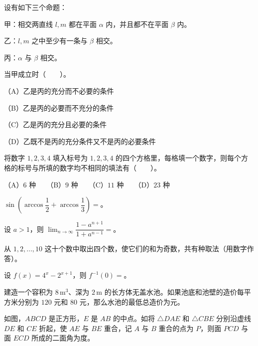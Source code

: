\begin{question}
设有如下三个命题：

甲：相交两直线 $l,m$ 都在平面 $\alpha$ 内，并且都不在平面 $\beta$ 内。

乙：$l,m$ 之中至少有一条与 $\beta$ 相交。

丙：$\alpha$ 与 $\beta$ 相交。

当甲成立时\mbox{（　　）}。

（A）乙是丙的充分而不必要的条件

（B）乙是丙的必要而不充分的条件

（C）乙是丙的充分且必要的条件

（D）乙既不是丙的充分条件又不是丙的必要条件

\end{question}
\begin{question}
将数字 $1,2,3,4$ 填入标号为 $1,2,3,4$ 的四个方格里，每格填一个数字，则每个方格的标号与所填的数字均不相同的填法有\mbox{（　　）}。

（A）$6$ 种　　（B）$9$ 种　　（C）$11$ 种　　（D）$23$ 种

\end{question}
\begin{question}
$\displaystyle\sin\left(\arccos\dfrac12+\arccos\dfrac13\right)=$\underline{\qquad\qquad}。

\end{question}
\begin{question}
设 $a>1$，则 $\displaystyle\lim_{n\to\infty}\dfrac{1-a^{n+1}}{1+a^{n-1}}=$\underline{\qquad\qquad}。

\end{question}
\begin{question}
从 $1,2,\ldots,10$ 这十个数中取出四个数，使它们的和为奇数，共有\underline{\qquad\qquad}种取法（用数字作答）。

\end{question}
\begin{question}
设 $f(x)=4^x-2^{x+1}$，则 $f^{-1}(0)=$\underline{\qquad\qquad}。

\end{question}
\begin{question}
建造一个容积为 $8\,\mathrm{m}^3$、深为 $2\,\mathrm m$ 的长方体无盖水池。如果池底和池壁的造价每平方米分别为 $120$ 元和 $80$ 元，那么水池的最低总造价为\underline{\qquad\qquad}元。

\Needspace{0.4\textheight}
\end{question}
\begin{question}
如图，$ABCD$ 是正方形，$E$ 是 $AB$ 的中点。如将 $\triangle DAE$ 和 $\triangle CBE$ 分别沿虚线 $DE$ 和 $CE$ 折起，使 $AE$ 与 $BE$ 重合，记 $A$ 与 $B$ 重合的点为 $P$，则面 $PCD$ 与面 $ECD$ 所成的二面角为\underline{\qquad\qquad}度。
\nopagebreak[4]
\begin{center}\end{center}
\nopagebreak[4]
\end{question}
